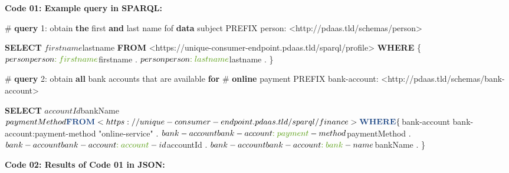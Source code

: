 \documentclass[12pt,english,a4paper,titlepage,cleardoublepage=empty,dottedtoc]{report}
\newenvironment{Shaded}{\begin{snugshade}}{\end{snugshade}}
\newcommand{\KeywordTok}[1]{\textcolor[rgb]{0.13,0.29,0.53}{\textbf{#1}}}
\newcommand{\DecValTok}[1]{\textcolor[rgb]{0.00,0.00,0.81}{#1}}
\newcommand{\CharTok}[1]{\textcolor[rgb]{0.31,0.60,0.02}{#1}}
\newcommand{\OtherTok}[1]{\textcolor[rgb]{0.56,0.35,0.01}{#1}}
\newcommand{\FunctionTok}[1]{\textcolor[rgb]{0.00,0.00,0.00}{#1}}
\newcommand{\NormalTok}[1]{#1}
\begin{document}
 \setcounter{page}{6} \pagestyle{plain}

\textbf{\protect\hypertarget{code-01_sparql-query}{}{Code 01: Example
query in SPARQL}:}

\begin{Shaded}
\begin{Highlighting}[numbers=left,,]
\NormalTok{# }\KeywordTok{query} \DecValTok{1}\NormalTok{: obtain }\KeywordTok{the} \FunctionTok{first} \KeywordTok{and} \FunctionTok{last}\NormalTok{ name fof }\KeywordTok{data}\NormalTok{ subject}
\NormalTok{PREFIX person: <http://pdaas.tld/schemas/person>}

\KeywordTok{SELECT}\NormalTok{ $firstname $lastname}
\KeywordTok{FROM}\NormalTok{ <https://unique-consumer-endpoint.pdaas.tld/sparql/profile>}
\KeywordTok{WHERE}\NormalTok{ \{}
\NormalTok{    $person person}\CharTok{:firstname}\NormalTok{ $firstname .}
\NormalTok{    $person person}\CharTok{:lastname}\NormalTok{ $lastname .}
\NormalTok{\}}


\NormalTok{# }\KeywordTok{query} \DecValTok{2}\NormalTok{: obtain }\KeywordTok{all}\NormalTok{ bank accounts that are available }\KeywordTok{for} 
\NormalTok{# }\KeywordTok{online}\NormalTok{ payment}
\NormalTok{PREFIX bank-account: <http://pdaas.tld/schemas/bank-account>}

\KeywordTok{SELECT}\NormalTok{ $accountId $bankName $paymentMethod}
\KeywordTok{FROM}\NormalTok{ <https://unique-consumer-endpoint.pdaas.tld/sparql/finance>}
\KeywordTok{WHERE}\NormalTok{ \{}
\NormalTok{    $bank-account bank-account}\CharTok{:payment}\NormalTok{-method }\OtherTok{"online-service"}\NormalTok{ .}
\NormalTok{    $bank-account bank-account}\CharTok{:payment}\NormalTok{-method $paymentMethod .}
\NormalTok{    $bank-account bank-account}\CharTok{:account}\NormalTok{-id $accountId . }
\NormalTok{    $bank-account bank-account}\CharTok{:bank}\NormalTok{-name $bankName .}
\NormalTok{\}}
\end{Highlighting}
\end{Shaded}

\newpage

\textbf{\protect\hypertarget{code-02_sparql-query-results}{}{Code 02:
Results of Code 01 in JSON}:}
\end{document}
